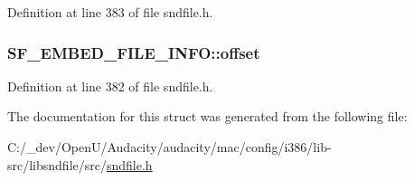Definition at line 383 of file sndfile.\+h.

\subsubsection[{\texorpdfstring{offset}{offset}}]{ S\+F\+\_\+\+E\+M\+B\+E\+D\+\_\+\+F\+I\+L\+E\+\_\+\+I\+N\+F\+O\+::offset}\hypertarget{struct_s_f___e_m_b_e_d___f_i_l_e___i_n_f_o_a3f9c37d1a474485d613276656e31d591}{}\label{struct_s_f___e_m_b_e_d___f_i_l_e___i_n_f_o_a3f9c37d1a474485d613276656e31d591}


Definition at line 382 of file sndfile.\+h.



The documentation for this struct was generated from the following file\+:\begin{DoxyCompactItemize}
\item 
C\+:/\+\_\+dev/\+Open\+U/\+Audacity/audacity/mac/config/i386/lib-\/src/libsndfile/src/\hyperlink{mac_2config_2i386_2lib-src_2libsndfile_2src_2sndfile_8h}{sndfile.\+h}\end{DoxyCompactItemize}
